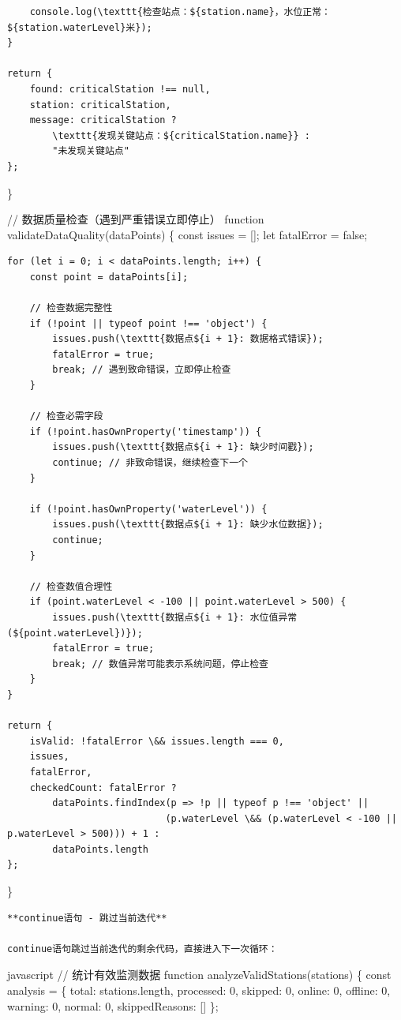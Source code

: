 {\begin{verbatim}
    console.log(\texttt{检查站点：${station.name}，水位正常：${station.waterLevel}米});
}

return {
    found: criticalStation !== null,
    station: criticalStation,
    message: criticalStation ? 
        \texttt{发现关键站点：${criticalStation.name}} : 
        "未发现关键站点"
};
\end{verbatim}

\}

// 数据质量检查（遇到严重错误立即停止） function validateDataQuality(dataPoints) \{ const issues = {[}{]}; let fatalError = false;

\begin{verbatim}
for (let i = 0; i < dataPoints.length; i++) {
    const point = dataPoints[i];
    
    // 检查数据完整性
    if (!point || typeof point !== 'object') {
        issues.push(\texttt{数据点${i + 1}: 数据格式错误});
        fatalError = true;
        break; // 遇到致命错误，立即停止检查
    }
    
    // 检查必需字段
    if (!point.hasOwnProperty('timestamp')) {
        issues.push(\texttt{数据点${i + 1}: 缺少时间戳});
        continue; // 非致命错误，继续检查下一个
    }
    
    if (!point.hasOwnProperty('waterLevel')) {
        issues.push(\texttt{数据点${i + 1}: 缺少水位数据});
        continue;
    }
    
    // 检查数值合理性
    if (point.waterLevel < -100 || point.waterLevel > 500) {
        issues.push(\texttt{数据点${i + 1}: 水位值异常 (${point.waterLevel})});
        fatalError = true;
        break; // 数值异常可能表示系统问题，停止检查
    }
}

return {
    isValid: !fatalError \&& issues.length === 0,
    issues,
    fatalError,
    checkedCount: fatalError ? 
        dataPoints.findIndex(p => !p || typeof p !== 'object' || 
                            (p.waterLevel \&& (p.waterLevel < -100 || p.waterLevel > 500))) + 1 :
        dataPoints.length
};
\end{verbatim}

\}

\begin{lstlisting}
**continue语句 - 跳过当前迭代**

continue语句跳过当前迭代的剩余代码，直接进入下一次循环：
\end{lstlisting}

javascript // 统计有效监测数据 function analyzeValidStations(stations) \{ const analysis = \{ total: stations.length, processed: 0, skipped: 0, online: 0, offline: 0, warning: 0, normal: 0, skippedReasons: {[}{]} \};

}
